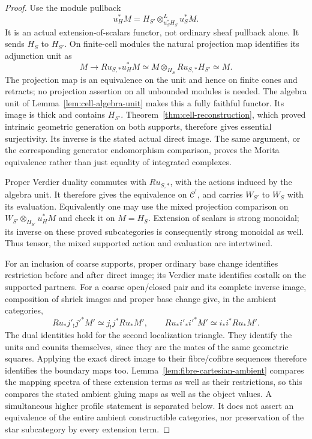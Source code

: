 \documentclass[11pt]{article}
\theoremstyle{definition}
\theoremstyle{remark}
\begin{document}
\begin{proof}
Use the module pullback
\[
 u_H^*M=H_{S'}\otimes^L_{u_S^*H_S}u_S^*M.
\]
It is an actual extension-of-scalars functor, not ordinary sheaf
pullback alone.  It sends $H_S$ to $H_{S'}$.  On finite-cell modules
the natural projection map identifies its adjunction unit as
\[
 M\longrightarrow Ru_{S,*}u_H^*M
 \simeq M\otimes_{H_S}Ru_{S,*}H_{S'}\simeq M.
\]
The projection map is an equivalence on the unit and hence on finite
cones and retracts; no projection assertion on all unbounded modules
is needed.  The algebra unit of Lemma~\ref{lem:cell-algebra-unit}
makes this a fully faithful functor.  Its image is thick and contains
$H_{S'}$.  Theorem~\ref{thm:cell-reconstruction}, which proved
intrinsic geometric generation on both supports, therefore gives
essential surjectivity.  Its inverse is the stated actual direct image.
The same argument, or the corresponding generator endomorphism
comparison, proves the Morita equivalence rather than just equality
of integrated complexes.

Proper Verdier duality commutes with $Ru_{S,*}$, with the actions
induced by the algebra unit.  It therefore gives the equivalence on
$\mathcal C^!$, and carries $W_{S'}$ to $W_S$ with its evaluation.
Equivalently one may use the mixed projection comparison on
$W_{S'}\otimes_{H_{S'}}u_H^*M$ and check it on $M=H_S$.
Extension of scalars is strong monoidal; its inverse on these proved
subcategories is consequently strong monoidal as well.  Thus tensor,
the mixed supported action and evaluation are intertwined.

For an inclusion of coarse supports, proper ordinary base change
identifies restriction before and after direct image; its Verdier
mate identifies costalk on the supported partners.  For a coarse
open/closed pair and its complete inverse image, composition of
shriek images and proper base change give, in the ambient categories,
\[
 Ru_*j'_!j'^*M'\simeq j_!j^*Ru_*M',\qquad
 Ru_*i'_*i'^*M'\simeq i_*i^*Ru_*M'.
\]
The dual identities hold for the second localization triangle.
They identify the units and counits themselves, since they are the
mates of the same geometric squares.  Applying the exact direct
image to their fibre/cofibre sequences therefore identifies the
boundary maps too.  Lemma~\ref{lem:fibre-cartesian-ambient} compares the mapping spectra
of these extension terms as well as their restrictions, so this compares the stated ambient gluing maps as well as the
object values.  A simultaneous higher profile statement is separated
below.
It does not assert an equivalence of the entire ambient constructible
categories, nor preservation of the star subcategory by every
extension term.


\end{proof}
\end{document}
